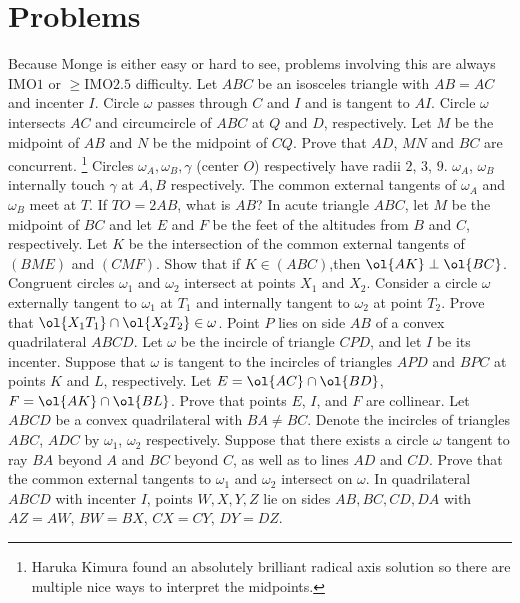\documentclass{seto}
\begin{document}
\section{Problems}
Because Monge is either easy or hard to see, problems involving this
are always IMO$1$ or $\ge$IMO$2.5$ difficulty.
 Let $ABC$ be an isosceles triangle with $AB=AC$ and incenter $I$. 
 Circle $\omega$ passes through $C$ and $I$ and is tangent to $AI$. 
 Circle $\omega$ intersects $AC$ and circumcircle of $ABC$ at $Q$ and $D$, respectively. 
 Let $M$ be the midpoint of $AB$ and $N$ be the midpoint of $CQ$. 
 Prove that $AD$, $MN$ and $BC$ are concurrent.
\footnote{Haruka Kimura found an absolutely brilliant radical axis solution
 so there are multiple nice ways to interpret the midpoints.}
\exercise[ARML 2024/I10] Circles $\omega_A,\omega_B,\gamma$ (center $O$) respectively have radii $2$, $3$, $9$. 
$\omega_A$, $\omega_B$ internally touch $\gamma$ at $A,B$ respectively. 
The common external tangents of $\omega_A$ and $\omega_B$ meet at $T$. 
If $TO = 2AB$, what is $AB$?
 In acute triangle $ABC$, 
let $M$ be the midpoint of $BC$ and let $E$ and $F$ be the feet of the altitudes from $B$ and $C$, respectively. 
Let $K$ be the intersection of the common external tangents of $(BME)$ and $(CMF)$. 
Show that if $K\in (ABC)$,then $\ol{AK}\perp\ol{BC}$.
\exercise[EGMO 2016/4] Congruent circles $\omega_1$ and $\omega_2$ intersect at points $X_1$ and $X_2$. 
 Consider a circle $\omega$ externally tangent to $\omega_1$ at $T_1$ 
 and internally tangent to $\omega_2$ at point $T_2$. Prove that $\ol{X_1T_1}\cap\ol{X_2T_2}\in\omega$.
\exercise[ISL 2007/G8] Point $ P$ lies on side $AB$ of a convex quadrilateral 
 $ABCD$. Let $\omega$ be the incircle of triangle $CPD$, 
 and let $ I$ be its incenter. 
 Suppose that $\omega$ is tangent to the incircles of triangles $APD$ and 
 $BPC$ at points $K$ and $L$, respectively. 
 Let $E=\ol{AC}\cap\ol{BD}$, $F=\ol{AK}\cap\ol{BL}$.
 Prove that points $E$, $I$, and $F$ are collinear. 
\exercise[IMO 2008/6] Let $ABCD$ be a convex quadrilateral with $BA \neq BC$. 
Denote the incircles of triangles $ABC$, $ADC$ by $\omega_1$, $\omega_2$ respectively. 
Suppose that there exists a circle $\omega$ tangent to ray $BA$ beyond $A$ and $BC$ beyond $C$, 
as well as to lines $AD$ and $CD$.
Prove that the common external tangents to $\omega_1$ and $\omega_2$ intersect on $\omega$.
\exercise[ELMO SL 2024/G4, by me] In quadrilateral $ABCD$ with incenter $I$,
 points $W,X,Y,Z$ lie on sides $AB, BC,CD,DA$ with 
 $AZ=AW$, $BW=BX$, $CX=CY$, $DY=DZ$. 
\end{document}
